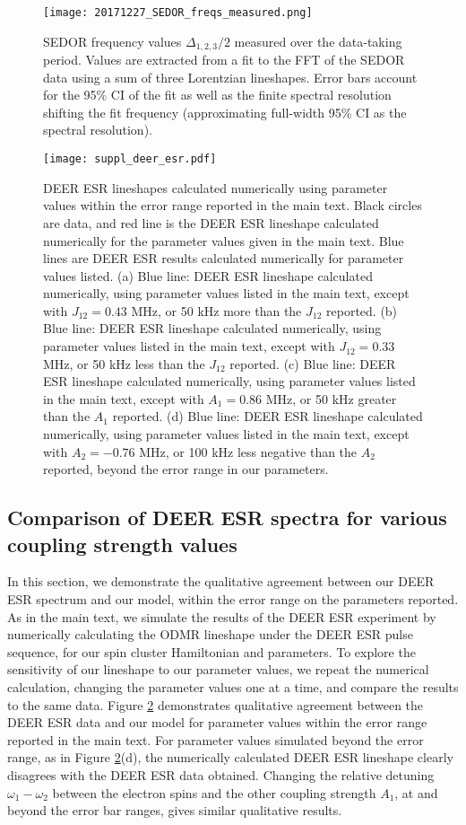 \documentclass[%
 reprint,
 amsmath,amssymb,
 aps,
]{revtex4-1}
\begin{document}
\begin{figure}[h!]
\centering
\texttt{[image: 20171227\_SEDOR\_freqs\_measured.png]}
\caption{\label{fig:many_sedor} SEDOR frequency values $\Delta_{1,2,3}/2$ measured over the data-taking period. Values are extracted from a fit to the FFT of the SEDOR data using a sum of three Lorentzian lineshapes. Error bars account for the 95\% CI of the fit as well as the finite spectral resolution shifting the fit frequency (approximating full-width 95\% CI as the spectral resolution).}
\end{figure}

\begin{figure}[htbp]
\centering
\caption{DEER ESR lineshapes calculated numerically using parameter values within the error range reported in the main text. Black circles are data, and red line is the DEER ESR lineshape calculated numerically for the parameter values given in the main text. Blue lines are DEER ESR results calculated numerically for parameter values listed. (a) Blue line: DEER ESR lineshape calculated numerically, using parameter values listed in the main text, except with $J_{12} = 0.43$ MHz, or 50 kHz more than the $J_{12}$ reported. (b) Blue line: DEER ESR lineshape calculated numerically, using parameter values listed in the main text, except with $J_{12} = 0.33$ MHz, or 50 kHz less than the $J_{12}$ reported. (c) Blue line: DEER ESR lineshape calculated numerically, using parameter values listed in the main text, except with $A_{1} = 0.86$ MHz, or 50 kHz greater than the $A_{1}$ reported. (d) Blue line: DEER ESR lineshape calculated numerically, using parameter values listed in the main text, except with $A_{2} = -0.76$ MHz, or 100 kHz less negative than the $A_{2}$ reported, beyond the error range in our parameters.}{\texttt{[image: suppl\_deer\_esr.pdf]}}
\label{deeresr}
\end{figure} 

\subsection{Comparison of DEER ESR spectra for various coupling strength values}
In this section, we demonstrate the qualitative agreement between our DEER ESR spectrum and our model, within the error range on the parameters reported. As in the main text, we simulate the results of the DEER ESR experiment by numerically calculating the ODMR lineshape under the DEER ESR pulse sequence, for our spin cluster Hamiltonian and parameters. To explore the sensitivity of our lineshape to our parameter values, we repeat the numerical calculation, changing the parameter values one at a time, and compare the results to the same data. Figure \ref{deeresr} demonstrates qualitative agreement between the DEER ESR data and our model for parameter values within the error range reported in the main text. For parameter values simulated beyond the error range, as in Figure \ref{deeresr}(d), the numerically calculated DEER ESR lineshape clearly disagrees with the DEER ESR data obtained. Changing the relative detuning $\omega_1 - \omega_2$ between the electron spins and the other coupling strength $A_{1}$, at and beyond the error bar ranges, gives similar qualitative results.
\end{document}
